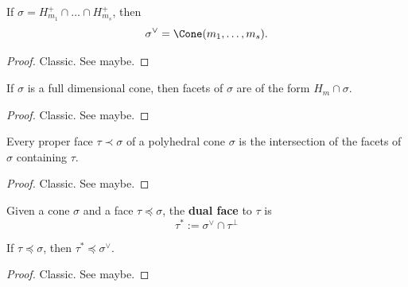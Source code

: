 \begin{proposition}
  \label{1-2-8-dual-cone-inter-halfspaces}

  If $\sigma = H_{m_1}^+ \cap \dots \cap H_{m_s}^+$, then
  $$\sigma^\vee = \Cone(m_1, \dots, m_s).$$
\end{proposition}
\begin{proof}

  Classic. See \cite{Oda_1988} maybe.
\end{proof}


\begin{proposition}
  \label{1-2-8-facet-full-dim-cone}

  If $\sigma$ is a full dimensional cone, then facets of $\sigma$ are of the form $H_m \cap \sigma$.
\end{proposition}
\begin{proof}

  Classic. See \cite{Oda_1988} maybe.
\end{proof}


\begin{proposition}
  \label{1-2-8-inter-facet}

  Every proper face $\tau \prec \sigma$ of a polyhedral cone $\sigma$ is the intersection of the facets of $\sigma$ containing $\tau$.
\end{proposition}
\begin{proof}

  Classic. See \cite{Oda_1988} maybe.
\end{proof}


\begin{definition}
  \label{1-2-10-dual-face}

  Given a cone $\sigma$ and a face $\tau \preceq \sigma$, the {\bf dual face} to $\tau$ is
  $$\tau^* := \sigma^\vee \cap \tau^\perp$$
\end{definition}


\begin{proposition}
  \label{1-2-10-dual-face-face-dual}

  If $\tau \preceq \sigma$, then $\tau^* \preceq \sigma^\vee$.
\end{proposition}
\begin{proof}

  Classic. See \cite{Oda_1988} maybe.
\end{proof}


